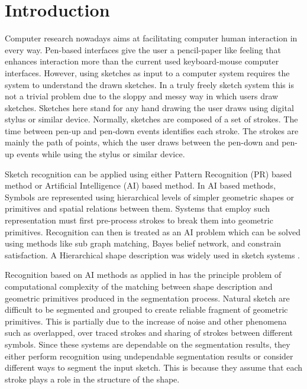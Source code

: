 \documentclass[preprint,10pt,5p,twocolumn]{elsarticle}
\begin{document}
\section{Introduction}

Computer research nowadays aims at facilitating computer human interaction in every way. Pen-based interfaces give the user a pencil-paper like feeling that enhances interaction more than the current used keyboard-mouse computer interfaces. However, using sketches as input to a computer system requires the system to understand the drawn sketches. In a truly freely sketch system this is not a trivial problem due to the sloppy and messy way in which users draw sketches. Sketches here stand for any hand drawing the user draws using digital stylus or similar device. Normally, sketches are composed of a set of strokes. The time between pen-up and pen-down events identifies each stroke. The strokes are mainly the path of points, which the user draws between the pen-down and pen-up events while using the stylus or similar device. 

Sketch recognition can be applied using either Pattern Recognition (PR) based method or Artificial Intelligence (AI) based method. In AI based methods, Symbols are represented using hierarchical levels of simpler geometric shapes or primitives and spatial relations between them. Systems that employ such representation must first pre-process strokes to break them into geometric primitives. Recognition can then is treated as an AI problem which can be solved using methods like sub graph matching, Bayes belief network, and constrain satisfaction. A Hierarchical shape description was widely used in sketch systems \cite{HierarchicalParsing7,SketchRead2007}.  %


Recognition based on AI methods as applied in \cite{SketchRead2007} has the principle problem of computational complexity of the matching between shape description and geometric primitives produced in the segmentation process. Natural sketch are difficult to be segmented and grouped to create reliable fragment of geometric primitives. This is partially due to the increase of noise and other phenomena such as overlapped, over traced strokes and sharing of strokes between different symbols. Since these systems are dependable on the segmentation results, they either perform recognition using undependable segmentation results or consider different ways to segment the input sketch. This is because they assume that each stroke plays a role in the structure of the shape. 
 
\end{document}
